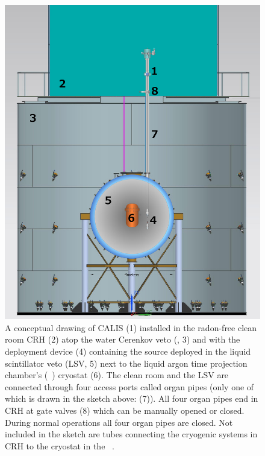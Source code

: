 \begin{figure}[htbp]
 \centering
\includegraphics[width=\textwidth]{Figures/DS50_with_CALIS}
\caption{A conceptual drawing of CALIS (1) installed in the radon-free clean room CRH (2) atop the water Cerenkov veto (\wcv, 3) and with the deployment device (4) containing the source
deployed in the liquid scintillator veto (LSV, 5) next to the liquid argon time projection chamber's (\lar\ \tpc) cryostat (6). The clean room and the LSV are connected through four access ports called organ pipes (only one of which is drawn in the sketch above: (7)). All four organ pipes end in CRH at gate valves (8) which can be manually opened or closed. During normal operations all four organ pipes are closed. Not included in the sketch are tubes connecting the cryogenic systems in CRH to the cryostat in the \lsv\ \cite{Agnes:2015qyz}.\label{fig:wholeAssembly_insideDetectors}\label{fig:DS50_with_CALIS}}
\end{figure}

